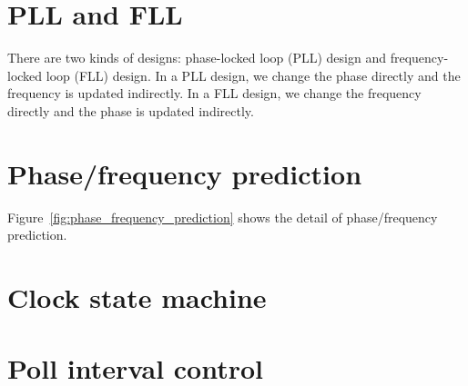 

\section{PLL and FLL}%
\label{sec:pll_and_fll}
There are two kinds of designs: phase-locked loop (PLL) design and
frequency-locked loop (FLL) design. In a PLL design, we change the phase
directly and the frequency is updated indirectly. In a FLL design, we change
the frequency directly and the phase is updated indirectly.

\section{Phase/frequency prediction}%
\label{sec:phase_frequency_prediction}
Figure~\ref{fig:phase_frequency_prediction} shows the detail of phase/frequency
prediction.




\section{Clock state machine}%
\label{sec:clock_state_machine}

\section{Poll interval control}%
\label{sec:poll_interval_control}


